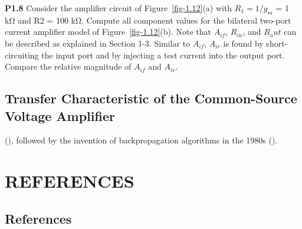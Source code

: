 \documentclass[
  11pt,
  letterpaper,
  abstract]{scrbook}
\begin{document}
\textbf{P1.8} Consider the amplifier circuit of Figure~\ref{fig-1.12}(a)
with \(R_1 = 1/g_m\) = 1 kΩ and R2 = 100 kΩ. Compute all component
values for the bilateral two-port current amplifier model of
Figure~\ref{fig-1.12}(b). Note that \(A_{if}\), \(R_{in}\), and
\(R_out\) can be described as explained in Section 1-3. Similar to
\(A_{if}\), \(A_{ir}\) is found by short-circuiting the input port and
by injecting a test current into the output port. Compare the relative
magnitude of \(A_{if}\) and \(A_{ir}\).

\chapter{Transfer Characteristic of the Common-Source Voltage
Amplifier}\label{sec-dl_primer}

(), followed by
the invention of backpropagation algorithms in the 1980s
().

\part{REFERENCES}

\chapter*{References}\label{references-1}

\end{document}
